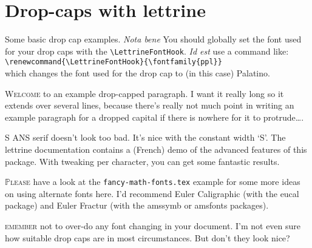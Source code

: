 \documentclass[12pt,article]{memoir}
\renewcommand{\LettrineFontHook}{\fontfamily{ppl}}
\begin{document}
\section*{Drop-caps with \textsf{lettrine}}

Some basic drop cap examples. \textit{Nota bene} You should globally set the font used for your drop caps with the \verb|\LettrineFontHook|. \textit{Id est} use a command like:\\
\verb|\renewcommand{\LettrineFontHook}{\fontfamily{ppl}}|\\
which changes the font used for the drop cap to (in this case) Palatino.

\lettrine{W}{elcome} to an example drop-capped paragraph. I want it really long so it extends over several lines, because there's really not much point in writing an example paragraph for a dropped capital if there is nowhere for it to protrude\dots.

\lettrine{\textsf{S}}{}%
{\sffamily\scriptsize ANS} serif doesn't look too bad. It's nice with the constant width `S'. The \textsf{lettrine} documentation contains a (French) demo of the advanced features of this package. With tweaking per character, you can get some fantastic results.

\lettrine{$\mathbb{P}$}{lease} have a look at the \texttt{fancy-math-fonts.tex} example for some more ideas on using alternate fonts here. I'd recommend Euler Caligraphic (with the \textsf{eucal} package) and Euler Fractur (with the \textsf{amssymb} or \textsf{amsfonts} packages).

\lettrine[loversize=0.2,findent=3pt,nindent=-2pt]{\selectfont {R}}{emember}
 not to over-do any font changing in your document. I'm not even sure how suitable drop caps are in most circumstances. But don't they look nice?
\end{document}
